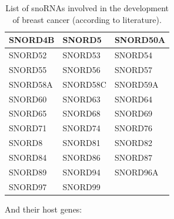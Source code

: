 \documentclass[journal]{IEEEtran}
\begin{document}
\begin{table}[h!]
\begin{tabularx}{\linewidth}{| X | X | X |}
        SNORD4B & SNORD5 & SNORD50A \\ \hline
        SNORD52 & SNORD53 & SNORD54 \\ \hline
        SNORD55 & SNORD56 & SNORD57 \\ \hline
        SNORD58A & SNORD58C & SNORD59A \\ \hline
        SNORD60 & SNORD63 & SNORD64 \\ \hline
        SNORD65 & SNORD68 & SNORD69 \\ \hline
        SNORD71 & SNORD74 & SNORD76 \\ \hline
        SNORD8 & SNORD81 & SNORD82 \\ \hline
        SNORD84 & SNORD86 & SNORD87 \\ \hline
        SNORD89 & SNORD94 & SNORD96A \\ \hline
        SNORD97 & SNORD99 & \\ \hline
    \end{tabularx}
    \caption{List of snoRNAs involved in the development of breast cancer (according to literature).}\label{table:snoRNAs_list}
\end{table}
\newpage
And their host genes:
\end{document}
